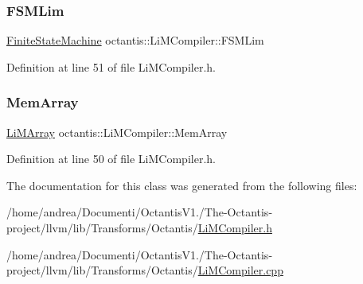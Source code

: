 \subsubsection{\texorpdfstring{F\+S\+M\+Lim}{FSMLim}}
{\footnotesize\ttfamily \hyperlink{classoctantis_1_1FiniteStateMachine}{Finite\+State\+Machine} octantis\+::\+Li\+M\+Compiler\+::\+F\+S\+M\+Lim\hspace{0.3cm}{\ttfamily [protected]}}



Definition at line 51 of file Li\+M\+Compiler.\+h.

\mbox{\label{classoctantis_1_1LiMCompiler_a11525f37ba87ad8a807407ce4b289c0d}} 
\subsubsection{\texorpdfstring{Mem\+Array}{MemArray}}
{\footnotesize\ttfamily \hyperlink{classoctantis_1_1LiMArray}{Li\+M\+Array} octantis\+::\+Li\+M\+Compiler\+::\+Mem\+Array\hspace{0.3cm}{\ttfamily [protected]}}



Definition at line 50 of file Li\+M\+Compiler.\+h.



The documentation for this class was generated from the following files\+:\begin{DoxyCompactItemize}
\item 
/home/andrea/\+Documenti/\+Octantis\+V1./\+The-\/\+Octantis-\/project/llvm/lib/\+Transforms/\+Octantis/\hyperlink{LiMCompiler_8h}{Li\+M\+Compiler.\+h}\item 
/home/andrea/\+Documenti/\+Octantis\+V1./\+The-\/\+Octantis-\/project/llvm/lib/\+Transforms/\+Octantis/\hyperlink{LiMCompiler_8cpp}{Li\+M\+Compiler.\+cpp}\end{DoxyCompactItemize}
